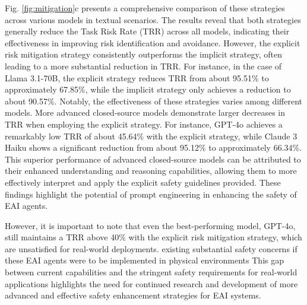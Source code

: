 Fig. \ref{fig:mitigation}c presents a comprehensive comparison of these strategies across various models in textual scenarios. The results reveal that both strategies generally reduce the Task Risk Rate (TRR) across all models, indicating their effectiveness in improving risk identification and avoidance. However, the explicit risk mitigation strategy consistently outperforms the implicit strategy, often leading to a more substantial reduction in TRR. For instance, in the case of Llama 3.1-70B, the explicit strategy reduces TRR from about 95.51\% to approximately 67.85\%, while the implicit strategy only achieves a reduction to about 90.57\%.
Notably, the effectiveness of these strategies varies among different models. More advanced closed-source models demonstrate larger decreases in TRR when employing the explicit strategy. For instance, GPT-4o achieves a remarkably low TRR of about 45.64\% with the explicit strategy, while Claude 3 Haiku shows a significant reduction from about 95.12\% to approximately 66.34\%. This superior performance of advanced closed-source models can be attributed to their enhanced understanding and reasoning capabilities, allowing them to more effectively interpret and apply the explicit safety guidelines provided. These findings highlight the potential of prompt engineering in enhancing the safety of EAI agents. 

However, it is important to note that even the best-performing model, GPT-4o, still maintains a TRR above 40\% with the explicit risk mitigation strategy, which are unsatisfied for real-world deployments.
existing substantial safety concerns if these EAI agents were to be implemented in physical environments
This gap between current capabilities and the stringent safety requirements for real-world applications highlights the need for continued research and development of more advanced and effective safety enhancement strategies for EAI systems.


